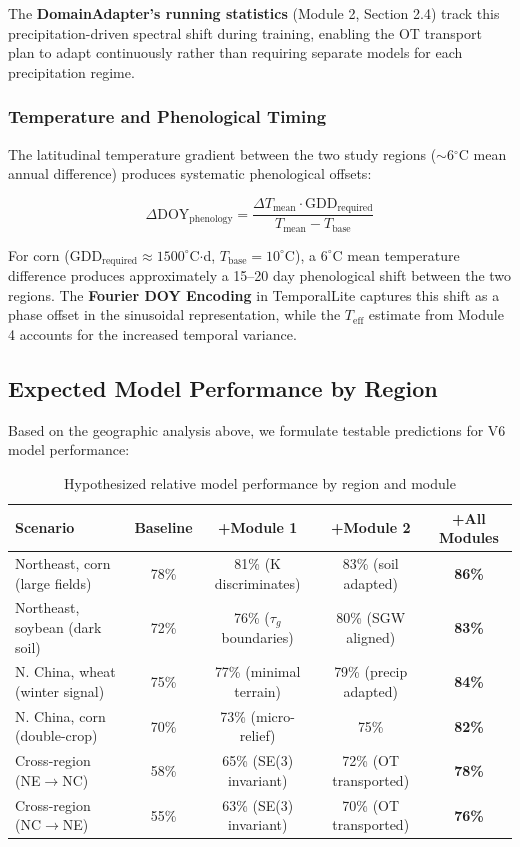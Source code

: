 The \textbf{DomainAdapter's running statistics} (Module 2, Section 2.4) track
this precipitation-driven spectral shift during training, enabling the OT
transport plan to adapt continuously rather than requiring separate models for
each precipitation regime.

\subsubsection{Temperature and Phenological Timing}

The latitudinal temperature gradient between the two study regions
($\sim$6$^\circ$C mean annual difference) produces systematic phenological
offsets:

\begin{equation}
    \Delta \text{DOY}_{\text{phenology}} = \frac{\Delta T_{\text{mean}} \cdot
    \text{GDD}_{\text{required}}}{T_{\text{mean}} - T_{\text{base}}}
\end{equation}

For corn (GDD$_{\text{required}} \approx 1500^\circ$C$\cdot$d, $T_{\text{base}} = 10^\circ$C),
a $6^\circ$C mean temperature difference produces approximately a 15--20 day
phenological shift between the two regions. The \textbf{Fourier DOY Encoding}
in TemporalLite captures this shift as a phase offset in the sinusoidal
representation, while the $T_{\text{eff}}$ estimate from Module 4 accounts for
the increased temporal variance.

\subsection{Expected Model Performance by Region}

Based on the geographic analysis above, we formulate testable predictions for
V6 model performance:

\begin{table}[h]
\centering
\caption{Hypothesized relative model performance by region and module}
\begin{tabular}{lcccc}
\toprule
\textbf{Scenario} & \textbf{Baseline} & \textbf{+Module 1} & \textbf{+Module 2} & \textbf{+All Modules} \\
\midrule
Northeast, corn (large fields) & 78\% & 81\% (K discriminates) & 83\% (soil adapted) & \textbf{86\%} \\
Northeast, soybean (dark soil) & 72\% & 76\% ($\tau_g$ boundaries) & 80\% (SGW aligned) & \textbf{83\%} \\
N. China, wheat (winter signal) & 75\% & 77\% (minimal terrain) & 79\% (precip adapted) & \textbf{84\%} \\
N. China, corn (double-crop) & 70\% & 73\% (micro-relief) & 75\% & \textbf{82\%} \\
Cross-region (NE$\to$NC) & 58\% & 65\% (SE(3) invariant) & 72\% (OT transported) & \textbf{78\%} \\
Cross-region (NC$\to$NE) & 55\% & 63\% (SE(3) invariant) & 70\% (OT transported) & \textbf{76\%} \\
\bottomrule
\end{tabular}
\end{table}


